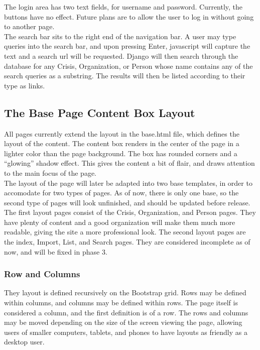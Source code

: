 \documentclass[12pt]{report}
\begin{document}
The login area has two text fields, for username and password.
Currently, the buttons have no effect.
Future plans are to allow the user to log in without going to another page.
\\


The search bar sits to the right end of the navigation bar.
A user may type queries into the search bar, and upon pressing Enter,
javascript will capture the text and a search url will be requested.
Django will then search through the database for any Crisis, Organization, or Person whose name
contains any of the search queries as a substring.
The results will then be listed according to their type as links.
\\


\subsection*{The Base Page Content Box Layout}
\hfill

All pages currently extend the layout in the base.html file,
which defines the layout of the content.
The content box renders in the center of the page in a lighter color than the page background.
The box has rounded corners and a ``glowing'' shadow effect.
This gives the content a bit of flair, and draws attention to the main focus of the page.
\\


The layout of the page will later be adapted into two base templates,
in order to accomodate for two types of pages.
As of now, there is only one base, so the second type of pages will look unfinished,
and should be updated before release.
The first layout pages consist of the Crisis, Organization, and Person pages.
They have plenty of content and a good organization will make them much more readable,
giving the site a more professional look.
The second layout pages are the index, Import, List, and Search pages.
They are considered incomplete as of now, and will be fixed in phase 3.
\\


\subsubsection*{Row and Columns}
They layout is defined recursively on the Bootstrap grid.
Rows may be defined within columns, and columns may be defined within rows.
The page itself is considered a column, and the first definition is of a row.
The rows and columns may be moved depending on the size of the screen viewing the page,
allowing users of smaller computers, tablets, and phones to have layouts as friendly as
a desktop user.
\\
\end{document}

